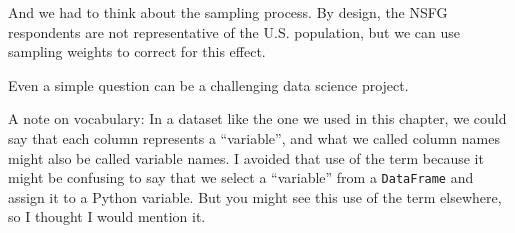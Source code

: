 \documentclass[
]{book}
\newcommand{\passthrough}[1]{#1}
\begin{document}
And we had to think about the sampling process. By design, the NSFG
respondents are not representative of the U.S. population, but we can
use sampling weights to correct for this effect.

Even a simple question can be a challenging data science project.

A note on vocabulary: In a dataset like the one we used in this chapter,
we could say that each column represents a ``variable'', and what we
called column names might also be called variable names. I avoided that
use of the term because it might be confusing to say that we select a
``variable'' from a \passthrough{\lstinline!DataFrame!} and assign it to
a Python variable. But you might see this use of the term elsewhere, so
I thought I would mention it.

\backmatter
\end{document}
